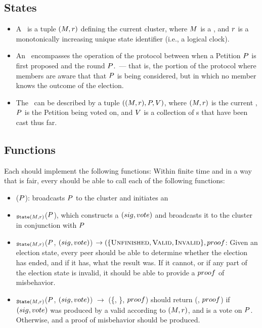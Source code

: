 \subsection{States}
\begin{itemize}
  \item A \StructState~is a tuple $(M, r)$ defining the current
    cluster, where $M$ is a \KwManifest, and $r$ is a
    monotonically increasing unique state identifier (i.e., a logical
    clock)\tocite.

  \item An \StructElection~encompasses the operation of the protocol between
    when a Petition $P$ is first proposed and the round
    $P$.\round~--- that is, the portion of the protocol where
    members are aware that that $P$ is being considered, but in which
    no member knows the outcome of the election.

  \item The \StructElectionState~can be described by a tuple $((M, r),
    P, V)$, where $(M, r)$ is the current \StructState,
    $P$ is the Petition being voted on, and $V$ is a
    collection of \StructBallot s that have been cast thus far.

\end{itemize}

\subsection{Functions}
Each \KwPeer should implement the following functions:
Within finite time and in a way that is fair, every \KwPeer should be able
to call each of the following functions:
\begin{itemize}
  \item \NamePropose(\StructPetition $P$): broadcasts $P$
    to the cluster and initiates an \StructElection
  \item \NameVote$_{\texttt{State} (M, r)}$(\StructPetition $P$), which
    constructs a \StructBallot $(sig, vote)$ and broadcasts it to the cluster in
    conjunction with $P$
  \item \NameEvaluate$_{\texttt{State} (M, r)}$(\StructPetition $P$,
    \StructBallot $(sig, vote)$) $\to (\{\textsc{Unfinished}, \textsc{Valid},
    \textsc{Invalid}\}, proof$: Given an election state, every peer should be able
    to determine whether the election has ended, and if it has, what the result
    was. If it cannot, or if any part of the election state is invalid, it
    should be able to provide a $proof$ of misbehavior.
  \item \NameEvaluate$_{\texttt{State} (M, r)}$(\StructPetition $P$,
    \StructBallot $(sig, vote)$) $\to$ (\{\AtomTrue, \AtomFalse\}, $proof$) should
    return (\AtomTrue, $proof$) if $(sig, vote)$ was produced by a valid \KwPeer
    according to $(M, r)$, and is a vote on $P$. Otherwise, \AtomTrue
    and a proof of misbehavior should be produced.
\end{itemize}

